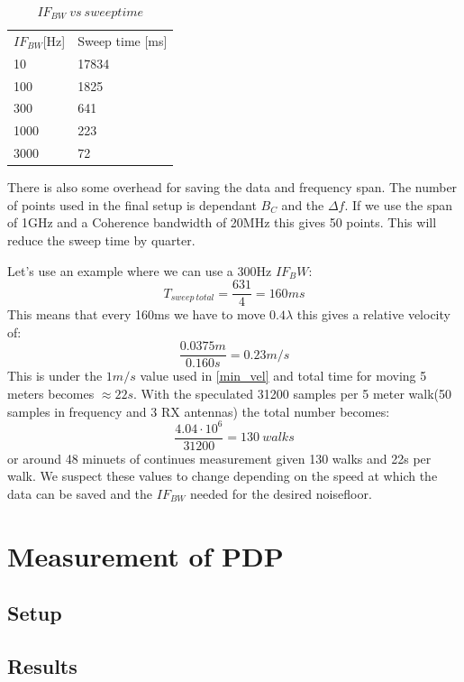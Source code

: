 \begin{table}[H]
\centering
\label{my-label}
\begin{tabular}{l|l}
\hline
$IF_{BW}${[}Hz{]} & Sweep time {[}ms{]} \\
10              & 17834               \\
100             & 1825                \\
300             & 641                 \\
1000            & 223                 \\
3000            & 72                 
\end{tabular}
\caption{$IF_{BW} \ vs \ sweep time$}
\end{table}

There is also some overhead for saving the data and frequency span. The number of points used in the final setup is dependant $B_C$ and the $\Delta f$. If we use the span of 1GHz and a Coherence bandwidth of 20MHz this gives 50 points. This will reduce the sweep time by quarter.

Let's  use an example where we can use a 300Hz $IF_BW$:
\begin{equation}
T_{sweep \ total} = \frac{631}{4} = 160ms
\end{equation}
This means that every 160ms we have to move $0.4 \lambda$ this gives a relative velocity of:
\begin{equation}
\frac{0.0375m}{0.160s} = 0.23 m/s
\end{equation}
This is under the $1m/s$ value used in \autoref{min_vel}
and total time for moving 5 meters becomes $\approx 22s$.
With the speculated 31200 samples per 5 meter walk(50 samples in frequency and 3 RX antennas) the total number becomes:
\begin{equation}
\frac{4.04 \cdot 10^6}{31200} = 130 \ walks
\end{equation}
or around 48 minuets of continues measurement given 130 walks and 22s per walk. We suspect these values to change depending on the speed at which the data can be saved and the $IF_{BW}$ needed for the desired noisefloor.

\chapter{Measurement of PDP}
\section{Setup}
\section{Results}
